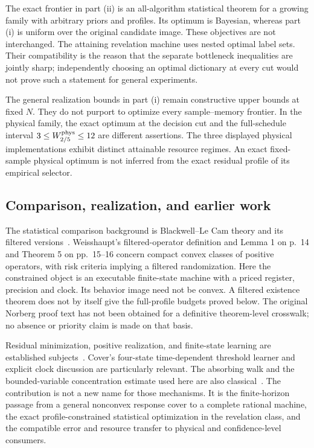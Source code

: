 The exact frontier in part (ii) is an all-algorithm statistical theorem
for a growing family with arbitrary priors and profiles. Its optimum
is Bayesian, whereas part (i) is uniform over the original candidate
image. These objectives are not interchanged. The attaining revelation
machine uses nested optimal label sets. Their compatibility is the
reason that the separate bottleneck inequalities are jointly sharp;
independently choosing an optimal dictionary at every cut would not
prove such a statement for general experiments.

The general realization bounds in part (i) remain constructive upper
bounds at fixed $N$. They do not purport to optimize every sample--memory
frontier. In the physical family, the exact optimum at the decision
cut and the full-schedule interval $3\le W^{\rm phys}_{2/5}\le12$
are different assertions. The three displayed physical implementations
exhibit distinct attainable resource regimes. An exact fixed-sample
physical optimum is not inferred from the exact residual profile of
its empirical selector.

\subsection{Comparison, realization, and earlier work}
The statistical comparison background is Blackwell--Le Cam theory and
its filtered versions~\cite{Blackwell1953,LeCam1964,Torgersen1991,
Norberg2002,Weisshaupt2002}. Weisshaupt's filtered-operator definition
and Lemma 1 on p.~14 and Theorem 5 on pp.~15--16 concern compact
convex classes of positive operators, with risk criteria implying a
filtered randomization. Here the constrained object is an executable
finite-state machine with a priced register, precision and clock.
Its behavior image need not be convex. A filtered existence theorem
does not by itself give the full-profile budgets proved below.
The original Norberg proof text has not been obtained for a definitive
theorem-level crosswalk; no absence or priority claim is made on that
basis.

Residual minimization, positive realization, and finite-state learning
are established subjects~\cite{Nerode1958,Fliess1975,Cover1969,
HellmanCover1970}. Cover's four-state time-dependent threshold learner
and explicit clock discussion are particularly relevant. The absorbing
walk and the bounded-variable concentration estimate used here are
also classical~\cite{Hoeffding1963}. The contribution is not a new name
for those mechanisms. It is the finite-horizon passage from a general
nonconvex response cover to a complete rational machine, the exact
profile-constrained statistical optimization in the revelation class,
and the compatible error and resource transfer to physical and
confidence-level consumers.

